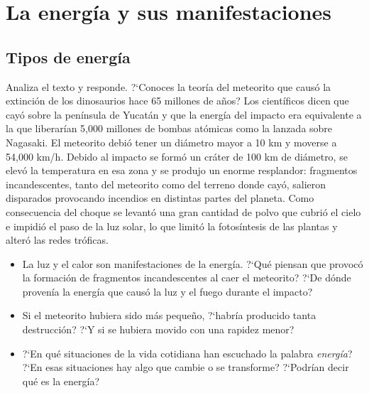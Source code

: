 \documentclass[11pt]{book}
\newcommand{\boxabstract}[2][fill=white]{
  \begin{tikzpicture}
    \node [abstractbox, #1] (box)
    {\begin{minipage}{0.9\linewidth}
        \setlength{\parindent}{2mm} %
        \normalfont #2
      \end{minipage}};
    \node[abstracttitle, right=10pt] at (box.north west) {Aprendizajes esperados:};
    \node[draw=none, fit=(box)] {};
  \end{tikzpicture}
}%
\begin{document}
\section{La energ\'ia y sus manifestaciones}
\subsection{Tipos de energ\'ia}

\begin{center}
\end{center}

Analiza el texto y responde.
?`Conoces la teor\'ia del meteorito que caus\'o la extinci\'on de los dinosaurios
hace 65 millones de años? Los cient\'ificos dicen que cay\'o sobre la pen\'insula
de Yucat\'an y que la energ\'ia del impacto era equivalente a la que liberar\'ian
5,000 millones de bombas at\'omicas como la lanzada sobre Nagasaki. El
meteorito debi\'o tener un di\'ametro mayor a 10 km y moverse a 54,000 km/h.
Debido al impacto se form\'o un cr\'ater de 100 km de di\'ametro, se elev\'o
la temperatura en esa zona y se produjo un enorme resplandor: fragmentos
incandescentes, tanto del meteorito como del terreno donde cay\'o, salieron
disparados provocando incendios en distintas partes del planeta.
Como consecuencia del choque se levant\'o una gran cantidad de polvo
que cubri\'o el cielo e impidi\'o el paso de la luz solar, lo que limit\'o la
fotos\'intesis de las plantas y alter\'o las redes tr\'oficas.
\begin{itemize}
  \item La luz y el calor son manifestaciones de la energ\'ia. ?`Qu\'e piensan que
        provoc\'o la formaci\'on de
        fragmentos incandescentes al caer el meteorito? ?`De
        d\'onde proven\'ia la energ\'ia que caus\'o la luz y el fuego durante el impacto?
  \item Si el meteorito hubiera sido m\'as pequeño, ?`habr\'ia producido tanta
        destrucci\'on? ?`Y si se
        hubiera movido con una rapidez menor?
  \item ?`En qu\'e situaciones de la vida cotidiana han escuchado la palabra
        \emph{energ\'ia}? ?`En esas
        situaciones hay algo que cambie o se transforme? ?`Podr\'ian decir qu\'e es la
        energ\'ia?
\end{itemize}
\end{document}
